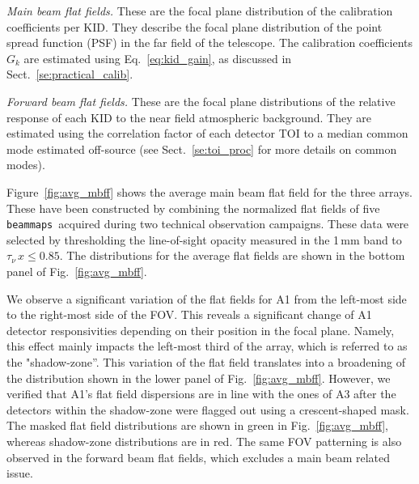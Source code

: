 \documentclass[traditionalabstract]{aa}
\newcommand{\bms}{{\tt beammaps}}
\newcommand{\taunu}{\tau_{\nu}}
\newcommand{\lp}[1]{#1}
\begin{document}
\noindent \emph{Main beam flat fields.} These are the focal plane
distribution of the calibration coefficients per KID. {\lp They describe the
focal plane distribution of the point spread function (PSF) in
the far field of the telescope.} The calibration coefficients $G_k$ are
estimated using Eq.~\ref{eq:kid_gain}, as discussed in
Sect.~\ref{se:practical_calib}. 

\noindent \emph{Forward beam flat fields.} These are the focal plane
distributions of the relative response of
each KID to the near field atmospheric background. They are estimated
using the correlation factor of each detector TOI 
to a median common mode estimated off-source (see Sect.~\ref{se:toi_proc} for
more details on common modes).

Figure~\ref{fig:avg_mbff} %
shows the average main beam %
flat field for the three arrays. These have been constructed by
combining the normalized flat fields of five \bms\ acquired during two
technical observation campaigns. These data were
selected by thresholding the line-of-sight opacity measured in the
1\,mm band to $\taunu\,x \leq 0.85$. The distributions for the average flat
fields are shown in the bottom panel of Fig.~\ref{fig:avg_mbff}.%

We observe a significant variation of the flat fields for A1 from the left-most side
to the right-most side of the FOV. This reveals a significant change of A1
detector responsivities depending on their position in the focal plane. Namely, this
effect mainly impacts the left-most third of the array, which is
referred to as the "shadow-zone''. This variation of the
flat field translates into a broadening of the distribution shown in
the lower panel of Fig.~\ref{fig:avg_mbff}.  However,
we verified that A1's flat field dispersions are in line with the ones of A3 after the
detectors within the shadow-zone were flagged out using a
crescent-shaped mask. The masked flat field distributions are shown in
green in Fig.~\ref{fig:avg_mbff}, %
whereas shadow-zone distributions are in red. The same FOV patterning
is also observed in the forward beam flat fields, which excludes a
main beam related issue. 
\end{document}
